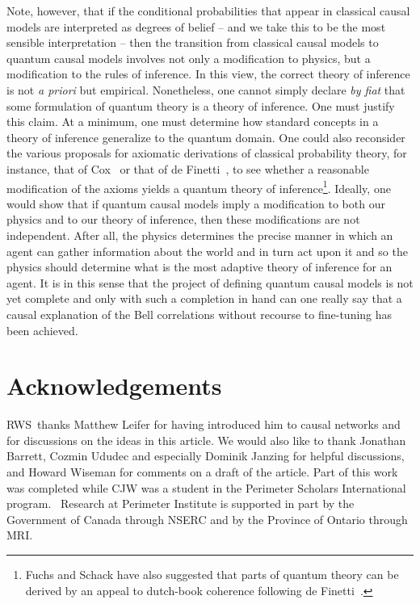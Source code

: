 \documentclass[12pt,onecolumn,nofootinbib]{revtex4-2}
\begin{document}
Note, however, that if the conditional probabilities that appear in classical causal models are interpreted as degrees of belief -- and we take this to be the most sensible interpretation -- then the transition from classical causal models to quantum causal models involves not only a modification to physics, but a modification to the rules of inference. In this view, the correct theory of inference is not \emph{a priori} but empirical. Nonetheless, one cannot simply declare \emph{by fiat} that some formulation of quantum theory is a theory of inference. One must justify this claim.  At a minimum, one must determine how standard concepts in a theory of inference generalize to the quantum domain.  One could also reconsider the various proposals for axiomatic derivations of classical probability theory, for instance, that of Cox~\cite{cox1946probability} or that of de Finetti~\cite{deFinetti1937foresight}, to see whether a reasonable modification of the axioms yields a quantum theory of inference\footnote{Fuchs and Schack have also suggested that parts of quantum theory can be derived by an appeal to dutch-book coherence following de Finetti~\cite{fuchs2009quantum}.}.  Ideally, one would show that if quantum causal models imply a modification to both our physics and to our theory of inference, then these modifications are not independent.  After all, the physics determines the precise manner in which an agent can gather information about the world and in turn act upon it and so the physics should determine what is the most adaptive theory of inference for an agent. It is in this sense that the project of defining quantum causal models is not yet complete and only with such a completion in hand can one really say that a causal explanation of the Bell correlations without recourse to fine-tuning has been achieved.

\section{Acknowledgements}

RWS\ thanks Matthew Leifer for having introduced him to causal networks and for
discussions on the ideas in this article. We would also like to thank
Jonathan Barrett, Cozmin Ududec and especially Dominik Janzing for helpful discussions, and Howard Wiseman for comments on a draft of the article.  Part of
this work was completed while CJW was a student in the Perimeter Scholars
International program. \ Research at Perimeter Institute is supported in
part by the Government of Canada through NSERC and by the Province of
Ontario through MRI. 
\end{document}
